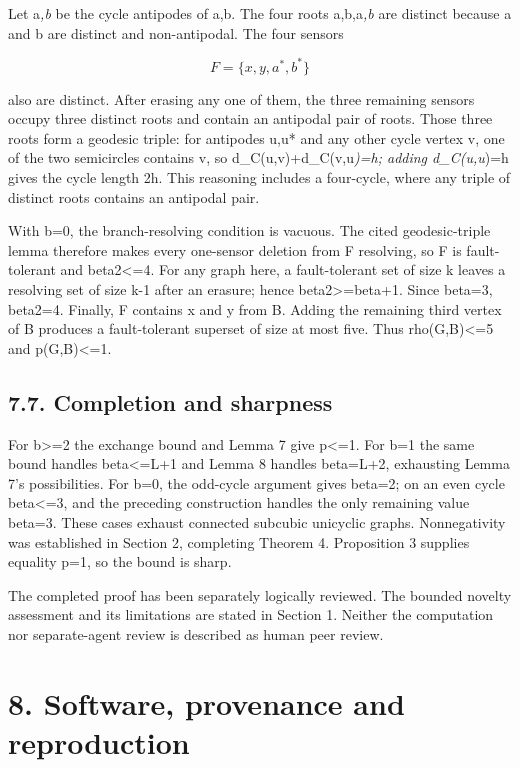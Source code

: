 \documentclass[
]{article}
\begin{document}
Let a\emph{,b} be the cycle antipodes of a,b. The four roots
a,b,a\emph{,b} are distinct because a and b are distinct and
non-antipodal. The four sensors

\[F=\{x,y,a^*,b^*\}\]

also are distinct. After erasing any one of them, the three remaining
sensors occupy three distinct roots and contain an antipodal pair of
roots. Those three roots form a geodesic triple: for antipodes u,u* and
any other cycle vertex v, one of the two semicircles contains v, so
d\_C(u,v)+d\_C(v,u\emph{)=h; adding d\_C(u,u})=h gives the cycle length
2h. This reasoning includes a four-cycle, where any triple of distinct
roots contains an antipodal pair.

With b=0, the branch-resolving condition is vacuous. The cited
geodesic-triple lemma therefore makes every one-sensor deletion from F
resolving, so F is fault-tolerant and beta2\textless=4. For any graph
here, a fault-tolerant set of size k leaves a resolving set of size k-1
after an erasure; hence beta2\textgreater=beta+1. Since beta=3, beta2=4.
Finally, F contains x and y from B. Adding the remaining third vertex of
B produces a fault-tolerant superset of size at most five. Thus
rho(G,B)\textless=5 and p(G,B)\textless=1.

\subsection{7.7. Completion and
sharpness}\label{completion-and-sharpness}

For b\textgreater=2 the exchange bound and Lemma 7 give p\textless=1.
For b=1 the same bound handles beta\textless=L+1 and Lemma 8 handles
beta=L+2, exhausting Lemma 7's possibilities. For b=0, the odd-cycle
argument gives beta=2; on an even cycle beta\textless=3, and the
preceding construction handles the only remaining value beta=3. These
cases exhaust connected subcubic unicyclic graphs. Nonnegativity was
established in Section 2, completing Theorem 4. Proposition 3 supplies
equality p=1, so the bound is sharp.

The completed proof has been separately logically reviewed. The bounded
novelty assessment and its limitations are stated in Section 1. Neither
the computation nor separate-agent review is described as human peer
review.

\section{8. Software, provenance and
reproduction}\label{software-provenance-and-reproduction}
\end{document}
